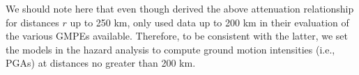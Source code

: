 We should note here that even though \citet{Kalkan2004} derived the above attenuation relationship for distances $r$ up to 250 km, \citet{Zafarani2014} only used data up to 200 km in their evaluation of the various GMPEs available. Therefore, to be consistent with the latter, we set the models in the hazard analysis to compute ground motion intensities (i.e., PGAs) at distances no greater than 200 km.
